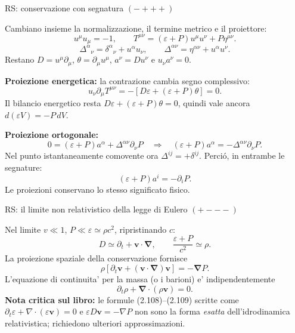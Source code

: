 \begin{frame}[t]{RS: conservazione con segnatura $(-+++)$}
\small\raggedright
\setlength{\abovedisplayskip}{3pt plus 1pt minus 1pt}
\setlength{\belowdisplayskip}{3pt plus 1pt minus 1pt}
\setlength{\abovedisplayshortskip}{0pt plus 1pt}
\setlength{\belowdisplayshortskip}{2pt plus 1pt minus 1pt}
Cambiano insieme la normalizzazione, il termine metrico e il proiettore:
\[
u^\mu u_\mu=-1,\qquad
T^{\mu\nu}=(\varepsilon+P)u^\mu u^\nu+P\eta^{\mu\nu}.
\]
\[
\Delta^\alpha{}_\nu=\delta^\alpha{}_\nu+u^\alpha u_\nu,\qquad
\Delta^{\alpha\nu}=\eta^{\alpha\nu}+u^\alpha u^\nu.
\]
Restano $D=u^\mu\partial_\mu$, $\theta=\partial_\mu u^\mu$,
$a^\nu=Du^\nu$ e $u_\nu a^\nu=0$.

\medskip
\textbf{Proiezione energetica:} la contrazione cambia segno complessivo:
\[
u_\nu\partial_\mu T^{\mu\nu}
=-\left[D\varepsilon+(\varepsilon+P)\theta\right]=0.
\]
Il bilancio energetico resta $D\varepsilon+(\varepsilon+P)\theta=0$,
quindi vale ancora $d(\varepsilon V)=-P\,dV$.

\medskip
\textbf{Proiezione ortogonale:}
\[
0=(\varepsilon+P)a^\alpha+\Delta^{\alpha\nu}\partial_\nu P
\quad\Longrightarrow\quad
\boxed{(\varepsilon+P)a^\alpha=-\Delta^{\alpha\nu}\partial_\nu P.}
\]
Nel punto istantaneamente comovente ora $\Delta^{ij}=+\delta^{ij}$.
Perci\'o, in entrambe le segnature:
\[
\boxed{(\varepsilon+P)a^i=-\partial_iP.}
\]
Le proiezioni conservano lo stesso significato fisico.
\end{frame}

\begin{frame}[t]{RS: il limite non relativistico della legge di Eulero $(+---)$}\small\raggedright

Nel limite $v\ll1$, $P\ll\varepsilon\simeq\rho c^2$, ripristinando $c$:
\[
D\simeq\partial_t+\mathbf v\cdot\boldsymbol\nabla,\qquad
\frac{\varepsilon+P}{c^2}\simeq\rho.
\]
La proiezione spaziale della conservazione fornisce
\[
\rho\left[\partial_t\mathbf v+(\mathbf v\cdot\boldsymbol\nabla)\mathbf v\right]
=-\boldsymbol\nabla P.
\]
L'equazione di continuita' per la massa (o i barioni) e' indipendentemente
\[
\partial_t\rho+\boldsymbol\nabla\cdot(\rho\mathbf v)=0.
\]
\textbf{Nota critica sul libro:} le formule (2.108)--(2.109) scritte come $\partial_t\varepsilon+\nabla\cdot(\varepsilon\mathbf v)=0$ e $\varepsilon D\mathbf v=-\nabla P$ non sono la forma \emph{esatta} dell'idrodinamica relativistica; richiedono ulteriori approssimazioni.

\end{frame}

